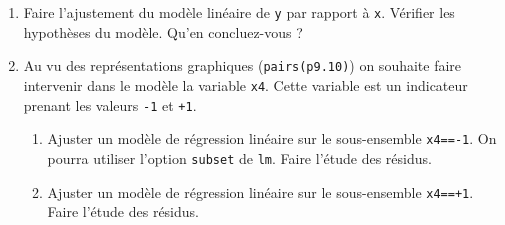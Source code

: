 \documentclass[11pt,a4paper]{article}
\newenvironment{code}{ \VerbatimEnvironment \begin{Verbatim}[commandchars=\\\{\}]}{\end{Verbatim}}
\newtheorem{exercice}{\textbf{Exercice}}
\begin{document}
\begin{enumerate}
	\item Faire l'ajustement du modèle linéaire de \verb+y+ par rapport à \verb+x+. Vérifier les hypothèses du modèle. Qu'en concluez-vous ?
	\item Au vu des représentations graphiques (\verb+pairs(p9.10)+) on souhaite faire intervenir dans le modèle la variable \verb+x4+. Cette variable est un indicateur prenant les valeurs \verb+-1+ et \verb|+1|.
	\begin{enumerate}
	\item Ajuster un modèle de régression linéaire sur le sous-ensemble \verb+x4==-1+. On pourra utiliser l'option \verb+subset+ de \verb+lm+. Faire l'étude des résidus.
	\item Ajuster un modèle de régression linéaire sur le sous-ensemble \verb|x4==+1|. Faire l'étude des résidus.
\end{enumerate}	 
	

\end{enumerate}

%
%
%
%


%
%
%
\end{document}
